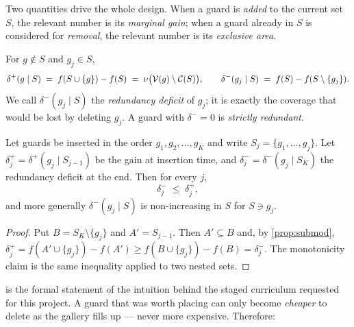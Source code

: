 \documentclass[11pt,a4paper]{article}
\begin{document}
Two quantities drive the whole design. When a guard is \emph{added} to the current set
$S$, the relevant number is its \emph{marginal gain}; when a guard already in $S$ is
considered for \emph{removal}, the relevant number is its \emph{exclusive area}.

\begin{definition}
For $g \notin S$ and $g_j \in S$,
\[
  \delta^{+}(g \mid S) \;=\; f(S \cup \{g\}) - f(S)
  \;=\; \nu\bigl(\mathcal{V}(g)\setminus\mathcal{C}(S)\bigr),
  \qquad
  \delta^{-}(g_j \mid S) \;=\; f(S) - f(S \setminus \{g_j\}).
\]
We call $\delta^{-}(g_j \mid S)$ the \emph{redundancy deficit} of $g_j$; it is exactly the
coverage that would be lost by deleting $g_j$. A guard with $\delta^{-} = 0$ is
\emph{strictly redundant}.
\end{definition}

\begin{proposition}\label{prop:prune}
Let guards be inserted in the order $g_1, g_2, \dots, g_K$ and write
$S_j = \{g_1,\dots,g_j\}$. Let $\delta^{+}_j = \delta^{+}(g_j \mid S_{j-1})$ be the gain at
insertion time, and $\delta^{-}_j = \delta^{-}(g_j \mid S_K)$ the redundancy deficit at the
end. Then for every $j$,
\[
  \delta^{-}_j \;\le\; \delta^{+}_j ,
\]
and more generally $\delta^{-}(g_j \mid S)$ is non-increasing in $S$ for $S \ni g_j$.
\end{proposition}

\begin{proof}
Put $B = S_K \setminus \{g_j\}$ and $A' = S_{j-1}$. Then $A' \subseteq B$ and, by
\cref{prop:submod},
$\delta^{+}_j = f(A' \cup \{g_j\}) - f(A') \ge f(B \cup \{g_j\}) - f(B) = \delta^{-}_j$.
The monotonicity claim is the same inequality applied to two nested sets.
\end{proof}

 is the formal statement of the intuition behind the staged curriculum
requested for this project. A guard that was worth placing can only become \emph{cheaper}
to delete as the gallery fills up --- never more expensive. Therefore:

\end{document}
